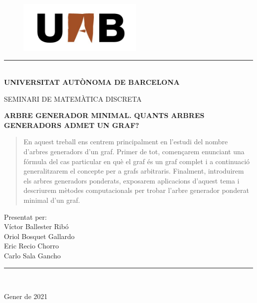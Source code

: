 \documentclass{article}
\begin{document}
\begin{titlepage}
    \begin{center}
        \vspace*{0in}
        \begin{figure}[H]
            \begin{center}
                \includegraphics[width=6cm]{Imatges/uab.jpg}
            \end{center}
        \end{figure}
        \rule{130mm}{0.1mm}\\
        \Large{\textbf{UNIVERSITAT AUTÒNOMA DE BARCELONA}} \\
        \vspace*{0.5in}
        \begin{large}
            SEMINARI DE MATEMÀTICA DISCRETA \\
        \end{large}
        \vspace*{1in}
        \begin{LARGE}
            \textbf{ARBRE GENERADOR MINIMAL. QUANTS ARBRES GENERADORS ADMET UN GRAF?} \\
        \end{LARGE}
        \vspace*{1in}
        \begin{abstract}
            En aquest treball ens centrem principalment en l'estudi del nombre d'arbres generadors d'un graf. Primer de tot, començarem enunciant una fórmula del cas particular en què el graf és un graf complet i a continuació ge\-ne\-ra\-lit\-za\-rem el concepte per a grafs arbitraris. Finalment, introduirem els arbres generadors ponderats, exposarem aplicacions d'aquest tema i descriurem mètodes computacionals per trobar l'arbre generador ponderat minimal d'un graf.
        \end{abstract}
        \vspace*{1.3in}
        \begin{large}
            Presentat per:\\
            \vspace*{0.1in}
            Víctor Ballester Ribó \\
            Oriol Bosquet Gallardo\\
            Eric Recio Chorro\\
            Carlo Sala Gancho\\
        \end{large}
        \vspace*{0.2in}
        \rule{80mm}{0.1mm}\\
        \vspace*{0.1in}
        \begin{large}
            Gener de 2021
        \end{large}
    \end{center}
    \newpage
\end{titlepage}
\newpage
\tableofcontents
\newpage
\end{document}
